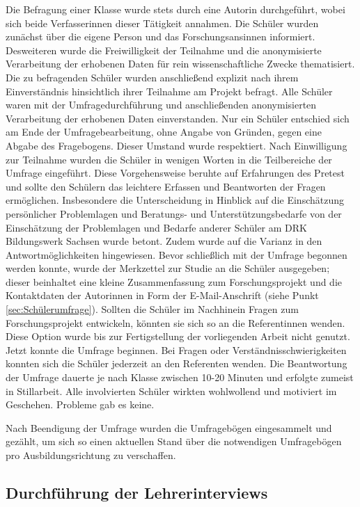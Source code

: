 Die Befragung einer Klasse wurde stets durch eine Autorin durchgeführt, wobei sich beide Verfasserinnen dieser Tätigkeit annahmen.
Die Schüler wurden zunächst über die eigene Person und das Forschungsansinnen informiert. Desweiteren wurde die Freiwilligkeit der Teilnahme und die anonymisierte Verarbeitung der erhobenen Daten für rein wissenschaftliche Zwecke thematisiert. Die zu befragenden Schüler wurden anschließend explizit nach ihrem Einverständnis hinsichtlich ihrer Teilnahme am Projekt befragt. Alle Schüler waren mit der Umfragedurchführung und anschließenden anonymisierten Verarbeitung der erhobenen Daten einverstanden. Nur ein Schüler entschied sich am Ende der Umfragebearbeitung, ohne Angabe von Gründen, gegen eine Abgabe des Fragebogens. Dieser Umstand wurde respektiert. Nach Einwilligung zur Teilnahme wurden die Schüler in wenigen Worten in die Teilbereiche der Umfrage eingeführt. Diese Vorgehensweise beruhte auf Erfahrungen des Pretest und sollte den Schülern das leichtere Erfassen und Beantworten der Fragen ermöglichen. Insbesondere die Unterscheidung in Hinblick auf die Einschätzung persönlicher Problemlagen und Beratungs- und Unterstützungsbedarfe von der Einschätzung der Problemlagen und Bedarfe anderer Schüler am DRK Bildungswerk Sachsen wurde betont. Zudem wurde auf die Varianz in den Antwortmöglichkeiten hingewiesen. Bevor schließlich mit der Umfrage begonnen werden konnte, wurde der Merkzettel zur Studie an die Schüler ausgegeben; dieser beinhaltet eine kleine Zusammenfassung zum Forschungsprojekt und die Kontaktdaten der Autorinnen in Form der E-Mail-Anschrift (siehe Punkt \ref{sec:Schülerumfrage}). Sollten die Schüler im Nachhinein Fragen zum Forschungsprojekt entwickeln, könnten sie sich so an die Referentinnen wenden. Diese Option wurde bis zur Fertigstellung der vorliegenden Arbeit nicht genutzt. Jetzt konnte die Umfrage beginnen. Bei Fragen oder Verständnisschwierigkeiten konnten sich die Schüler jederzeit an den Referenten wenden. Die Beantwortung der Umfrage dauerte je nach Klasse zwischen 10-20 Minuten und erfolgte zumeist in Stillarbeit. Alle involvierten Schüler wirkten wohlwollend und motiviert im Geschehen. Probleme gab es keine.

Nach Beendigung der Umfrage wurden die Umfragebögen eingesammelt und gezählt, um sich so einen aktuellen Stand über die notwendigen Umfragebögen pro Ausbildungsrichtung zu verschaffen.

\subsection{Durchführung der Lehrerinterviews}
\label{sec:DurchführungDerLehrerinterviews}

